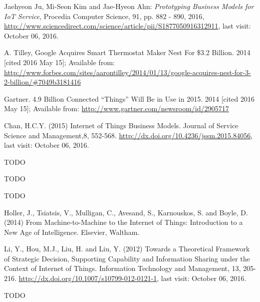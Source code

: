 \begin{thebibliography}{99}
	 Jaehyeon Ju, Mi-Seon Kim and Jae-Hyeon Ahn: \emph{Prototyping Business Models for IoT Service}, Procedia Computer Science, 91, pp. 882 - 890, 2016, \url{http://www.sciencedirect.com/science/article/pii/S1877050916312911}, last visit: October 06, 2016.
 	
 	  A. Tilley, Google Acquires Smart Thermostat Maker Nest For \$3.2 Billion. 2014  [cited 2016 May 15]; Available from: \url{http://www.forbes.com/sites/aarontilley/2014/01/13/google-acquires-nest-for-3-2-billion/#7049b3181416}
 	
 	  Gartner. 4.9 Billion Connected ``Things'' Will Be in Use in 2015. 2014  [cited 2016 May 15]; Available from: \url{http://www.gartner.com/newsroom/id/2905717}

	 Chan, H.C.Y. (2015) Internet of Things Business Models. Journal of Service Science and Management,8, 552-568. \url{http://dx.doi.org/10.4236/jssm.2015.84056}, last visit: October 06, 2016.

	 TODO

	 TODO

	 TODO

	 Holler, J., Tsiatsis, V., Mulligan, C., Avesand, S., Karnouskos, S. and Boyle, D. (2014) From Machine-to-Machine to the Internet of Things: Introduction to a New Age of Intelligence. Elsevier, Waltham.

	 Li, Y., Hou, M.J., Liu, H. and Liu, Y. (2012) Towards a Theoretical Framework of Strategic Decision, Supporting Capability and Information Sharing under the Context of Internet of Things. Information Technology and Management, 13, 205-216.
	\url{http://dx.doi.org/10.1007/s10799-012-0121-1}, last visit: October 06, 2016.

	 TODO

 \end{thebibliography}

